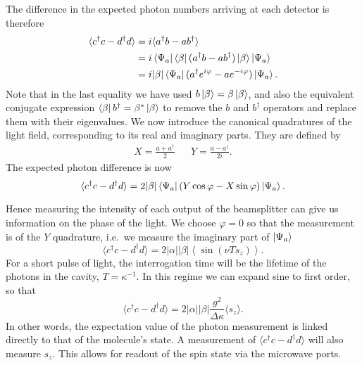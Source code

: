 The difference in the expected photon numbers arriving at each
detector is therefore
%
\begin{align}
  \langle c^\dagger c - d^\dagger d\rangle &= i\langle a^\dagger b-
  ab^\dagger \rangle \\
  &= i \bra{\Psi_a}\bra{\beta}(a^\dagger b-
  ab^\dagger)\ket{\beta}\ket{\Psi_a} \\
  & = i|\beta| \bra{\Psi_a}(a^\dagger e^{i\varphi} - a
  e^{-i\varphi})\ket{\Psi_a}.
\end{align}
%
Note that in the last equality we have used $b\ket{\beta}=\beta\ket{\beta}$,
and also the equivalent conjugate expression $\bra{\beta}b^\dagger =
\beta^*\ket{\beta}$ to remove the $b$ and $b^\dagger$ operators and replace
them with their eigenvalues.
%
We now introduce the canonical quadratures of the light field, corresponding to
its real and imaginary parts. They are defined by~\cite{gerry_knight_2004}
%
\begin{align}
  X = \frac{a + a^\dagger}{2} && Y = \frac{a - a^\dagger}{2i}.
\end{align}
%
The expected photon difference is now
\begin{equation}
  \langle c^\dagger c - d^\dagger d\rangle =
  2|\beta|\bra{\Psi_a}(Y\cos\varphi - X\sin\varphi)\ket{\Psi_a}.
  \label{squeeze:eqn:homoquads}
\end{equation}

Hence measuring the intensity of each output of the beamsplitter can give us
information on the phase of the light. We choose $\varphi = 0$ so that the
measurement is of the $Y$ quadrature, i.e.\ we measure the imaginary part of
$\ket{\Psi_a}$
%
\begin{equation}
  \langle c^\dagger c - d^\dagger d\rangle =  2
  |\alpha||\beta|\left\langle\sin(\nu T s_z)\right\rangle.
\end{equation}
%
For a short pulse of light, the interrogation time will be the lifetime of the
photons in the cavity, $T = \kappa^{-1}$. In this regime we can expand sine
to first order, so that
%
\begin{equation}
  \langle c^\dagger c - d^\dagger d\rangle = 2|\alpha||\beta|
  \frac{g^2}{\Delta\kappa}\langle s_z\rangle.
  \label{mws:eqn:homomeas}
\end{equation}
%
In other words, the expectation value of the photon measurement is linked
directly to that of the molecule's state. A measurement of $\langle c^\dagger c
- d^\dagger d\rangle$ will also measure $s_z$. This allows for readout of the
spin state via the microwave ports.

